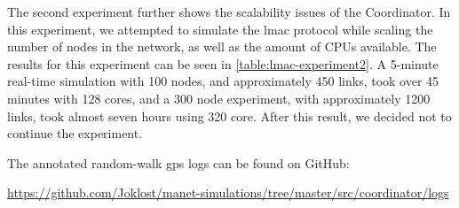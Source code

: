 The second experiment further shows the scalability issues of the Coordinator. In this experiment, we
attempted to simulate the \gls{lmac} protocol while scaling the number of nodes in the network, as well as the
amount of CPUs available. The results for this experiment can be seen in \autoref{table:lmac-experiment2}. A
5-minute real-time simulation with 100 nodes, and approximately 450 links, took over 45 minutes with 128
cores, and a 300 node experiment, with approximately 1200 links, took almost seven hours using 320 core. After
this result, we decided not to continue the experiment. \medbreak


The annotated random-walk \gls{gps} logs can be found on GitHub:

{\footnotesize \url{https://github.com/Joklost/manet-simulations/tree/master/src/coordinator/logs}}

